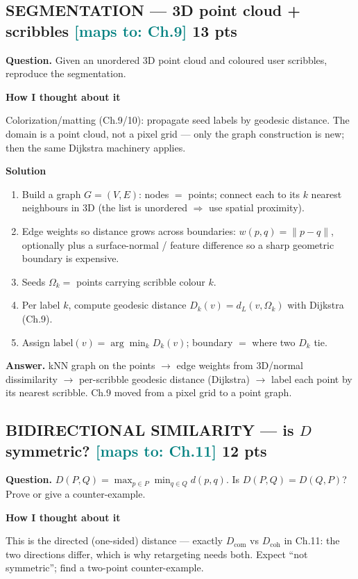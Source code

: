 \documentclass[11pt]{article}
\newcommand{\step}[1]{\smallskip\par\noindent\textbf{\textcolor{amber}{#1}}\par\nobreak}
\newcommand{\maps}[1]{{\small\textcolor{teal}{[maps to: #1]}}}
\newcommand{\ans}[1]{\begin{answer}\textbf{Answer.} #1\end{answer}}
\begin{document}
\subsection{SEGMENTATION --- 3D point cloud + scribbles \hfill \maps{Ch.9} \hfill \textnormal{\small 13 pts}}
\begin{qbox}\textbf{Question.} Given an unordered 3D point cloud and coloured user scribbles, reproduce the
segmentation.\end{qbox}

\step{How I thought about it}
Colorization/matting (Ch.9/10): propagate seed labels by geodesic distance. The domain is a point cloud, not a
pixel grid --- only the graph construction is new; then the same Dijkstra machinery applies.

\step{Solution}
\begin{enumerate}
  \item Build a graph $G=(V,E)$: nodes $=$ points; connect each to its $k$ nearest neighbours in 3D (the list is
  unordered $\Rightarrow$ use spatial proximity).
  \item Edge weights so distance grows across boundaries: $w(p,q)=\|p-q\|$, optionally plus a surface-normal /
  feature difference so a sharp geometric boundary is expensive.
  \item Seeds $\Omega_k=$ points carrying scribble colour $k$.
  \item Per label $k$, compute geodesic distance $D_k(v)=d_L(v,\Omega_k)$ with Dijkstra (Ch.9).
  \item Assign $\text{label}(v)=\arg\min_k D_k(v)$; boundary $=$ where two $D_k$ tie.
\end{enumerate}
\ans{kNN graph on the points $\to$ edge weights from 3D/normal dissimilarity $\to$ per-scribble geodesic distance
(Dijkstra) $\to$ label each point by its nearest scribble. Ch.9 moved from a pixel grid to a point graph.}

\subsection{BIDIRECTIONAL SIMILARITY --- is $D$ symmetric? \hfill \maps{Ch.11} \hfill \textnormal{\small 12 pts}}
\begin{qbox}\textbf{Question.} $D(P,Q)=\max_{p\in P}\min_{q\in Q}d(p,q)$. Is $D(P,Q)=D(Q,P)$? Prove or give a
counter-example.\end{qbox}

\step{How I thought about it}
This is the directed (one-sided) distance --- exactly $D_{\text{com}}$ vs $D_{\text{coh}}$ in Ch.11: the two
directions differ, which is why retargeting needs both. Expect ``not symmetric''; find a two-point counter-example.
\end{document}
